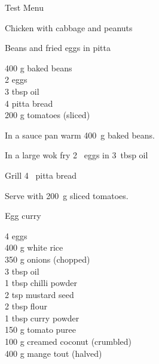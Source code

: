 \begin{menu}{Test Menu}
\begin{recipe}{2}{Chicken with cabbage and peanuts}
\begin{instructions}
    \end{instructions}
    \end{recipe}%
  
    \begin{recipe}{1}{Beans and fried eggs in pitta}%
    
		\begin{ingredients}
		400 g baked beans  \\
	2  eggs  \\
	3 tbsp oil  \\
	4  pitta bread  \\
	200 g tomatoes (sliced) \\
	
		\end{ingredients}
	
    \begin{instructions}
    \item 
        In a sauce pan warm
        400~g  baked beans.
      \item 
        In a large wok fry
        2~  eggs
        in
        3~tbsp  oil\item 
        Grill
        4~  pitta bread\item 
        Serve with 200~g sliced tomatoes.
      
    \end{instructions}
    \end{recipe}%
  
    \begin{recipe}{2}{Egg curry}%
    
		\begin{ingredients}
		4  eggs  \\
	400 g white rice  \\
	350 g onions (chopped) \\
	3 tbsp oil  \\
	1 tbsp chilli powder  \\
	2 tsp mustard seed  \\
	2 tbsp flour  \\
	1 tbsp curry powder  \\
	150 g tomato puree  \\
	100 g creamed coconut (crumbled) \\
	400 g mange tout (halved) \\
	
		\end{ingredients}
	
	

\end{recipe}
\end{menu}
